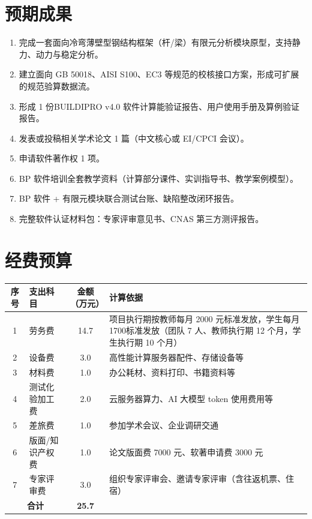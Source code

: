 \documentclass{hqu-proposal}
\begin{document}
\section{预期成果}

\begin{enumerate}[label=(\arabic*)]
    \item 完成一套面向冷弯薄壁型钢结构框架（杆/梁）有限元分析模块原型，支持静力、动力与稳定分析。
    \item 建立面向 GB 50018、AISI S100、EC3 等规范的校核接口方案，形成可扩展的规范验算数据流。
    \item 形成 1 份BUILDIPRO v4.0 软件计算能验证报告、用户使用手册及算例验证报告。
    \item 发表或投稿相关学术论文 1 篇（中文核心或 EI/CPCI 会议）。
    \item 申请软件著作权 1 项。
    \item BP 软件培训全套教学资料（计算部分课件、实训指导书、教学案例模型）。
    \item BP 软件 + 有限元模块联合测试台账、缺陷整改闭环报告。
    \item 完整软件认证材料包：专家评审意见书、CNAS 第三方测评报告。
\end{enumerate}

\section{经费预算}

\begin{center}
    \begin{tabular}{clcp{8cm}}
        \toprule
        \textbf{序号} & \textbf{支出科目} & \textbf{金额（万元）} & \textbf{计算依据} \\
        \midrule
        1 & 劳务费 & 14.7 & 项目执行期按教师每月 2000 元标准发放，学生每月1700标准发放（团队 {7} 人、教师执行期 {12} 个月，学生执行期 {10} 个月） \\
        2 & 设备费 & 3.0 & 高性能计算服务器配件、存储设备等 \\
        3 & 材料费 & 1.0 & 办公耗材、资料打印、书籍资料等 \\
        4 & 测试化验加工费 & 2.0 & 云服务器算力、AI 大模型 token 使用费用等 \\
        5 & 差旅费 & 1.0 & 参加学术会议、企业调研交通 \\
        6 & 版面/知识产权费 & 1.0 & 论文版面费 7000 元、软著申请费 3000 元 \\
        7 & 专家评审费 & 3.0 & 组织专家评审会、邀请专家评审（含往返机票、住宿） \\
        \midrule
        \multicolumn{2}{c}{\textbf{合计}} & \textbf{25.7} & \\
        \bottomrule
    \end{tabular}
\end{center}
\end{document}
